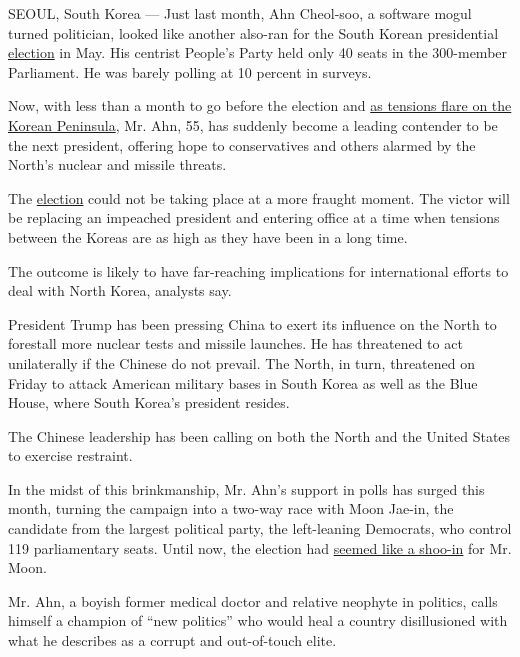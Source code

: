 SEOUL, South Korea --- Just last month, Ahn Cheol-soo, a software mogul
turned politician, looked like another also-ran for the South Korean
presidential
\href{https://www.nytimes3xbfgragh.onion/2020/04/10/world/asia/coronavirus-south-korea-election.html}{election}
in May. His centrist People's Party held only 40 seats in the 300-member
Parliament. He was barely polling at 10 percent in surveys.

Now, with less than a month to go before the election and
\href{https://www.nytimes3xbfgragh.onion/2017/04/14/world/asia/north-korea-china-nuclear.html}{as
tensions flare on the Korean Peninsula}, Mr. Ahn, 55, has suddenly
become a leading contender to be the next president, offering hope to
conservatives and others alarmed by the North's nuclear and missile
threats.

The
\href{https://www.nytimes3xbfgragh.onion/2020/04/10/world/asia/coronavirus-south-korea-election.html}{election}
could not be taking place at a more fraught moment. The victor will be
replacing an impeached president and entering office at a time when
tensions between the Koreas are as high as they have been in a long
time.

The outcome is likely to have far-reaching implications for
international efforts to deal with North Korea, analysts say.

President Trump has been pressing China to exert its influence on the
North to forestall more nuclear tests and missile launches. He has
threatened to act unilaterally if the Chinese do not prevail. The North,
in turn, threatened on Friday to attack American military bases in South
Korea as well as the Blue House, where South Korea's president resides.

The Chinese leadership has been calling on both the North and the United
States to exercise restraint.

In the midst of this brinkmanship, Mr. Ahn's support in polls has surged
this month, turning the campaign into a two-way race with Moon Jae-in,
the candidate from the largest political party, the left-leaning
Democrats, who control 119 parliamentary seats. Until now, the election
had
\href{https://www.nytimes3xbfgragh.onion/2017/03/10/world/asia/south-korea-liberals-impeachment.html}{seemed
like a shoo-in} for Mr. Moon.

Mr. Ahn, a boyish former medical doctor and relative neophyte in
politics, calls himself a champion of ``new politics'' who would heal a
country disillusioned with what he describes as a corrupt and
out-of-touch elite.

